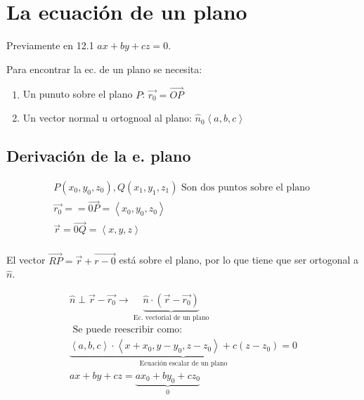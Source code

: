 \section{La ecuación de un plano}
Previamente en 12.1 $ax+by+cz = 0$.
\begin{figure}[htbp]
    \centering
    \caption{}
    \label{}
\end{figure}
Para encontrar la ec. de un plano se necesita:
    \begin{enumerate}
        \item Un punuto sobre el plano $P$: $\vec{r_0}=\overrightarrow{OP}$
        \item Un vector normal u ortognoal al plano: $\hat{n}_0 \left\langle a,b,c \right\rangle $
    \end{enumerate}
\subsection{Derivación de la e. plano}
\begin{center}
    \begin{align*}
        P(x_0,y_0,z_0), Q(x_1,y_1,z_1) \text{  Son dos puntos sobre el plano  } \\ 
        \vec{r_0} = = \overrightarrow{0P} = \left\langle x_0,y_0,z_0 \right\rangle \\ 
        \vec{r} = \overrightarrow{0Q} = \left\langle x,y,z \right\rangle \\ 
    \end{align*}
\end{center}
El vector $\vec{RP} = \vec{r} + \vec{r-0}$ está sobre el plano, por lo que tiene que ser ortogonal a $\hat{n}$.
 \begin{center}
    \begin{align*}
        \hat{n} \perp \vec{r}- \vec{r_0} \rightarrow \underbrace{\hat{n}\cdot (\vec{r}-\vec{r_0})}_{\text{  Ec. vectorial de un plano  }} \\ 
       \text{  Se puede reescribir como:  } \\ 
        \underbrace{\left\langle a,b,c \right\rangle \cdot \left\langle x+x_0,y-y_0,z-z_0 \right\rangle + c(z-z_0) = 0 }_{\text{  Ecuación escalar de un plano  }} \\ 
        ax+by+cz = \underbrace{ax_0+by_0+cz_0}_{0} \\ 
    \end{align*}
 \end{center}

